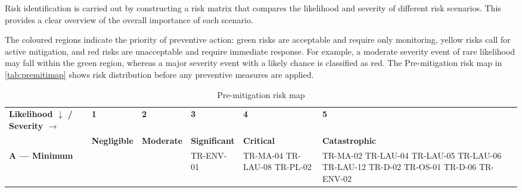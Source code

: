 \noindent Risk identification is carried out by constructing a risk matrix that compares the likelihood and severity of different risk scenarios. This provides a clear overview of the overall importance of each scenario. 

\noindent The coloured regions indicate the priority of preventive action: green risks are acceptable and require only monitoring, yellow risks call for active mitigation, and red risks are unacceptable and require immediate response. For example, a moderate severity event of rare likelihood may fall within the green region, whereas a major severity event with a likely chance is classified as red. The Pre-mitigation risk map in \autoref{tab:premitimap} shows risk distribution before any preventive measures are applied.


\begin{table}[H]
\centering
\caption{Pre-mitigation risk map}
\scriptsize
\renewcommand{\arraystretch}{1.4}
\setlength{\tabcolsep}{3pt}

\begin{tabular}{>{\raggedright\arraybackslash}p{3.6cm}|
>{\centering\arraybackslash}p{2.1cm}|
>{\centering\arraybackslash}p{2.1cm}|
>{\centering\arraybackslash}p{2.1cm}|
>{\centering\arraybackslash}p{2.1cm}|
>{\centering\arraybackslash}p{2.4cm}}
\rowcolor{gray!20}
\textbf{Likelihood $\downarrow$ / Severity $\rightarrow$} 
& \textbf{1} & \textbf{2} & \textbf{3} & \textbf{4} & \textbf{5} \\

\rowcolor{gray!10}
& \textbf{Negligible} 
& \textbf{Moderate} 
& \textbf{Significant} 
& \textbf{Critical} 
& \textbf{Catastrophic} \\

\textbf{A — Minimum}
& \cellcolor{green!20} 
& \cellcolor{green!20} 
& \cellcolor{green!20} TR-ENV-01
& \cellcolor{yellow!30} TR-MA-04 \newline TR-LAU-08 \newline TR-PL-02 
& \cellcolor{yellow!30} TR-MA-02 \newline TR-LAU-04 \newline TR-LAU-05 \newline TR-LAU-06 \newline TR-LAU-12 \newline TR-D-02 \newline TR-OS-01 \newline TR-D-06 \newline TR-ENV-02 \\


\end{tabular}
\end{table}
